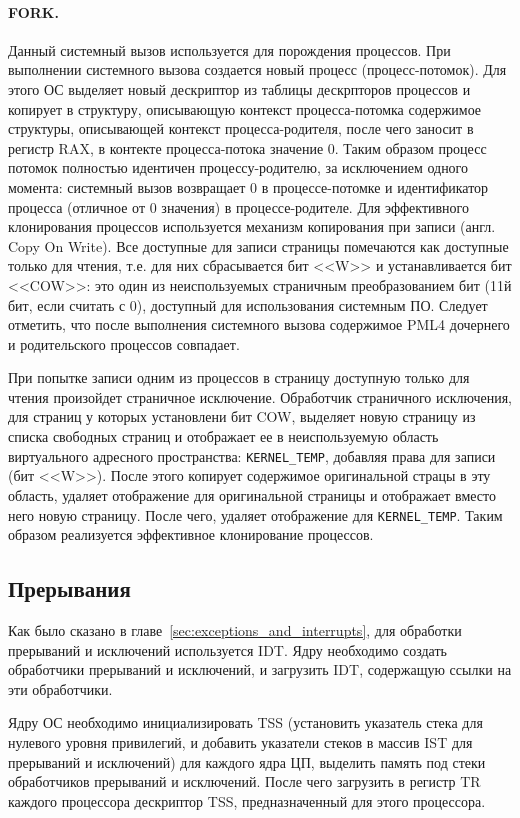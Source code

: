 \paragraph{FORK.} Данный системный вызов используется для порождения процессов. При выполнении системного
вызова создается новый процесс (процесс-потомок). Для этого ОС выделяет новый дескриптор из таблицы
дескрпторов процессов и копирует в структуру, описывающую контекст процесса-потомка содержимое структуры,
описывающей контекст процесса-родителя, после чего заносит в регистр RAX, в контекте процесса-потока значение 0.
Таким образом процесс потомок полностью идентичен процессу-родителю, за исключением одного момента: системный вызов
возвращает 0 в процессе-потомке и идентификатор процесса (отличное от 0 значения) в процессе-родителе. Для эффективного
клонирования процессов используется механизм копирования при записи (англ. Copy On Write). Все доступные для записи
страницы помечаются как доступные только для чтения, т.е. для них сбрасывается бит <<W>> и устанавливается бит <<COW>>:
это один из неиспользуемых страничным преобразованием бит (11й бит, если считать с 0), доступный для использования
системным ПО. Следует отметить, что после выполнения системного вызова содержимое PML4 дочернего и родительского процессов
совпадает.

При попытке записи одним из процессов в страницу доступную только для чтения произойдет страничное исключение.
Обработчик страничного исключения, для страниц у которых установлени бит COW, выделяет новую страницу из списка
свободных страниц и отображает ее в неиспользуемую область виртуального адресного пространства: \texttt{KERNEL\_TEMP},
добавляя права для записи (бит <<W>>). После этого копирует содержимое оригинальной страцы в эту область, удаляет
отображение для оригинальной страницы и отображает вместо него новую страницу. После чего, удаляет отображение для
\texttt{KERNEL\_TEMP}. Таким образом реализуется эффективное клонирование процессов.


\subsection{Прерывания}
Как было сказано в главе~\ref{sec:exceptions_and_interrupts}, для обработки прерываний
и исключений используется IDT. Ядру необходимо создать обработчики прерываний и исключений,
и загрузить IDT, содержащую ссылки на эти обработчики.

Ядру ОС необходимо инициализировать TSS (установить указатель стека для нулевого уровня привилегий,
и добавить указатели стеков в массив IST для прерываний и исключений) для каждого ядра ЦП, выделить
память под стеки обработчиков прерываний и исключений. После чего загрузить в регистр TR каждого
процессора дескриптор TSS, предназначенный для этого процессора.

